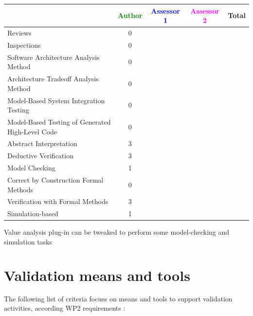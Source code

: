 \begin{tabular}{|l | c | c | c | c|}
\hline
& \textcolor{green}{Author} & \textcolor{blue}{Assessor 1} & \textcolor{magenta}{Assessor 2} & Total \\
\hline 
Reviews & 0 & & &  \\
\hline
Inspections & 0 & & &  \\
\hline
Software Architecture Analysis Method & 0 & & &  \\
\hline
Architecture Tradeoff Analysis Method & 0 & & &  \\
\hline
Model-Based System Integration Testing & 0 & & &  \\
\hline
Model-Based Testing of Generated High-Level Code & 0 & & &  \\
\hline
Abstract Interpretation & 3 & & &  \\
\hline
Deductive Verification & 3 & & &  \\
\hline
Model Checking & 1 & & &  \\
\hline
Correct by Construction Formal Methods & 0 & & &  \\
\hline
Verification with Formal Methods & 3 & & &  \\
\hline
Simulation-based & 1 & & &  \\
\hline
\end{tabular}
\begin{author_comment}
Value analysis plug-in can be tweaked to perform some 
model-checking and simulation tasks
\end{author_comment}

\section{Validation means and tools}

The following list of criteria focuss on means and tools to support validation activities, according WP2  requirements :

